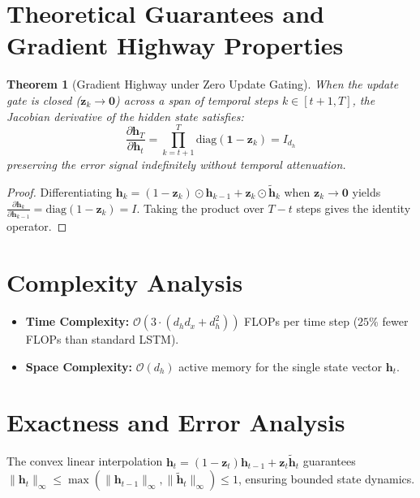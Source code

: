 \documentclass[11pt,a4paper]{article}
\newtheorem{theorem}{Theorem}
\theoremstyle{definition}
\begin{document}
\section{Theoretical Guarantees and Gradient Highway Properties}

\begin{theorem}[Gradient Highway under Zero Update Gating]
\label{thm:gru_highway}
When the update gate is closed ($\mathbf{z}_k \to \mathbf{0}$) across a span of temporal steps $k \in [t+1, T]$, the Jacobian derivative of the hidden state satisfies:
\begin{equation}
\frac{\partial \mathbf{h}_T}{\partial \mathbf{h}_t} = \prod_{k=t+1}^T \text{diag}(\mathbf{1} - \mathbf{z}_k) = I_{d_h}
\end{equation}
preserving the error signal indefinitely without temporal attenuation.
\end{theorem}

\begin{proof}
Differentiating $\mathbf{h}_k = (1 - \mathbf{z}_k) \odot \mathbf{h}_{k-1} + \mathbf{z}_k \odot \tilde{\mathbf{h}}_k$ when $\mathbf{z}_k \to \mathbf{0}$ yields $\frac{\partial \mathbf{h}_k}{\partial \mathbf{h}_{k-1}} = \text{diag}(1 - \mathbf{z}_k) = I$. Taking the product over $T - t$ steps gives the identity operator.
\end{proof}

\section{Complexity Analysis}

\begin{itemize}
    \item \textbf{Time Complexity:} $\mathcal{O}(3 \cdot (d_h d_x + d_h^2))$ FLOPs per time step ($25\%$ fewer FLOPs than standard LSTM).
    \item \textbf{Space Complexity:} $\mathcal{O}(d_h)$ active memory for the single state vector $\mathbf{h}_t$.
\end{itemize}

\section{Exactness and Error Analysis}

The convex linear interpolation $\mathbf{h}_t = (1 - \mathbf{z}_t)\mathbf{h}_{t-1} + \mathbf{z}_t \tilde{\mathbf{h}}_t$ guarantees $\|\mathbf{h}_t\|_\infty \le \max(\|\mathbf{h}_{t-1}\|_\infty, \|\tilde{\mathbf{h}}_t\|_\infty) \le 1$, ensuring bounded state dynamics.
\end{document}
